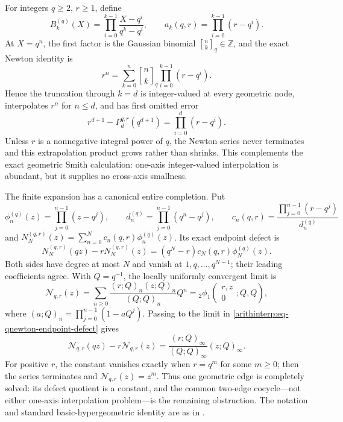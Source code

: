 \documentclass[11pt,oneside]{article}
\theoremstyle{definition}
\theoremstyle{remark}
\newcommand{\Z}{\mathbb Z}
\begin{document}
For integers $q\ge2$, $r\ge1$, define
\begin{equation}
 B_k^{(q)}(X)=\prod_{i=0}^{k-1}\frac{X-q^i}{q^k-q^i},\qquad
 a_k(q,r)=\prod_{i=0}^{k-1}(r-q^i).
\end{equation}
At $X=q^n$, the first factor is the Gaussian binomial
$\genfrac{[}{]}{0pt}{}{n}{k}_q\in\Z$, and the exact
Newton identity is
\begin{equation}
 r^n=\sum_{k=0}^n \genfrac{[}{]}{0pt}{}{n}{k}_q
      \prod_{i=0}^{k-1}(r-q^i).
 \label{arithinterp:eq-qnewton}
\end{equation}
Hence the truncation through $k=d$ is integer-valued at every geometric node, interpolates
$r^n$ for $n\le d$, and has first omitted error
\begin{equation}
 r^{d+1}-P_d^{q,r}(q^{d+1})=\prod_{i=0}^{d}(r-q^i).
 \label{arithinterp:eq-first-extrapolation}
\end{equation}
Unless $r$ is a nonnegative integral power of $q$, the Newton series never terminates and this
extrapolation product grows rather than shrinks.  This complements the exact geometric Smith
calculation: one-axis integer-valued interpolation is abundant, but it supplies no
cross-axis smallness.

The finite expansion has a canonical entire completion.  Put
\[
 \phi_n^{(q)}(z)=\prod_{j=0}^{n-1}(z-q^j),\qquad
 d_n^{(q)}=\prod_{j=0}^{n-1}(q^n-q^j),\qquad
 c_n(q,r)=\frac{\prod_{j=0}^{n-1}(r-q^j)}{d_n^{(q)}}
\]
and $N_N^{(q,r)}(z)=\sum_{n=0}^Nc_n(q,r)\phi_n^{(q)}(z)$.  Its exact endpoint defect is
\begin{equation}
 N_N^{(q,r)}(qz)-rN_N^{(q,r)}(z)
 =(q^N-r)c_N(q,r)\phi_N^{(q)}(z).
 \label{arithinterp:eq-qnewton-endpoint-defect}
\end{equation}
Both sides have degree at most $N$ and vanish at $1,q,\ldots,q^{N-1}$; their leading
coefficients agree.  With $Q=q^{-1}$, the locally uniformly convergent limit is
\begin{equation}
 \mathcal N_{q,r}(z)
 =\sum_{n\ge0}\frac{(r;Q)_n(z;Q)_n}{(Q;Q)_n}Q^n
 ={}_2\phi_1\!\left(\begin{matrix}r,z\\0\end{matrix};Q,Q\right),
 \label{arithinterp:eq-entire-qnewton}
\end{equation}
where $(a;Q)_n=\prod_{j=0}^{n-1}(1-aQ^j)$.  Passing to the limit in
\eqref{arithinterp:eq-qnewton-endpoint-defect} gives
\begin{equation}
 \boxed{
 \mathcal N_{q,r}(qz)-r\mathcal N_{q,r}(z)
 =\frac{(r;Q)_\infty}{(Q;Q)_\infty}(z;Q)_\infty.}
 \label{arithinterp:eq-entire-qnewton-defect}
\end{equation}
For positive $r$, the constant vanishes exactly when $r=q^m$ for some $m\ge0$; then the
series terminates and $\mathcal N_{q,r}(z)=z^m$.  Thus one geometric edge is completely
solved: its defect quotient is a constant, and the common two-edge cocycle---not either
one-axis interpolation problem---is the remaining obstruction.  The notation and standard
basic-hypergeometric identity are as in \cite{GasperRahman}.
\end{document}
